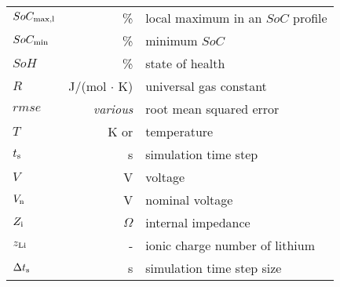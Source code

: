 \begin{longtable}{lrl}
$SoC_\text{max,l}$				& \%						& local maximum in an $SoC$ profile \\
$SoC_\text{min}$					& \%						& minimum $SoC$ \\
$SoH$							& \%						& state of health \\
$R$								& J/(mol $\cdot$ K)			& universal gas constant  \\
$rmse$							& \textit{various}			& root mean squared error \\
$T$								& K or \cel					& temperature \\
$t_\text{s}$						& s							& simulation time step \\
$V$								& V							& voltage \\
$V_\text{n}$						& V							& nominal voltage \\
$Z_\text{i}$						& $\Omega$					& internal impedance \\
$z_\text{Li}$					& -							& ionic charge number of lithium \\
$\Delta t_\text{s}$				& s							& simulation time step size \\
\bottomrule
\end{longtable}

\captionsetup{list=true}%
\setcounter{table}{0}